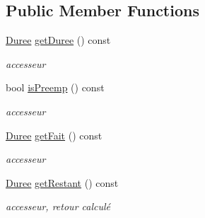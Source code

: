 \subsection*{Public Member Functions}
\begin{DoxyCompactItemize}
\item 
\hypertarget{class_unitaire_aee42e9fae46a5be23802afe5c6c08a31}{}\hyperlink{class_t_i_m_e_1_1_duree}{Duree} \hyperlink{class_unitaire_aee42e9fae46a5be23802afe5c6c08a31}{get\+Duree} () const \label{class_unitaire_aee42e9fae46a5be23802afe5c6c08a31}

\begin{DoxyCompactList}\small\item\em accesseur \end{DoxyCompactList}\item 
\hypertarget{class_unitaire_adba3a8de0fe6273cea7eecda3520bfcd}{}bool \hyperlink{class_unitaire_adba3a8de0fe6273cea7eecda3520bfcd}{is\+Preemp} () const \label{class_unitaire_adba3a8de0fe6273cea7eecda3520bfcd}

\begin{DoxyCompactList}\small\item\em accesseur \end{DoxyCompactList}\item 
\hypertarget{class_unitaire_a9ab243102aa0572048a956204532b201}{}\hyperlink{class_t_i_m_e_1_1_duree}{Duree} \hyperlink{class_unitaire_a9ab243102aa0572048a956204532b201}{get\+Fait} () const \label{class_unitaire_a9ab243102aa0572048a956204532b201}

\begin{DoxyCompactList}\small\item\em accesseur \end{DoxyCompactList}\item 
\hypertarget{class_unitaire_a2fa3fa1073200a18c9a2706b37eb78e6}{}\hyperlink{class_t_i_m_e_1_1_duree}{Duree} \hyperlink{class_unitaire_a2fa3fa1073200a18c9a2706b37eb78e6}{get\+Restant} () const \label{class_unitaire_a2fa3fa1073200a18c9a2706b37eb78e6}

\begin{DoxyCompactList}\small\item\em accesseur, retour calculé \end{DoxyCompactList}\end{DoxyCompactItemize}
